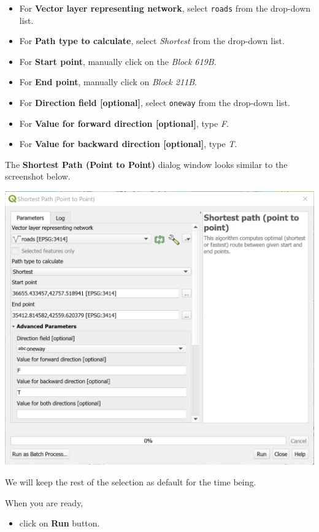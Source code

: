 \documentclass[
  letterpaper,
  DIV=11,
  numbers=noendperiod]{scrreprt}
\providecommand{\tightlist}{%
  \setlength{\itemsep}{0pt}\setlength{\parskip}{0pt}}\usepackage{longtable,booktabs,array}
\begin{document}
\begin{itemize}
\item
  For \textbf{Vector layer representing network}, select \texttt{roads}
  from the drop-down list.
\item
  For \textbf{Path type to calculate}, select \emph{Shortest} from the
  drop-down list.
\item
  For \textbf{Start point}, manually click on the \emph{Block 619B}.
\item
  For \textbf{End point}, manually click on \emph{Block 211B}.
\item
  For \textbf{Direction field {[}optional{]}}, select \texttt{oneway}
  from the drop-down list.
\item
  For \textbf{Value for forward direction {[}optional{]}}, type
  \emph{F}.
\item
  For \textbf{Value for backward direction {[}optional{]}}, type
  \emph{T}.
\end{itemize}

The \textbf{Shortest Path (Point to Point)} dialog window looks similar
to the screenshot below.

\includegraphics{./img09/image23.jpg}

We will keep the rest of the selection as default for the time being.

When you are ready,

\begin{itemize}
\tightlist
\item
  click on \textbf{Run} button.
\end{itemize}
\end{document}
